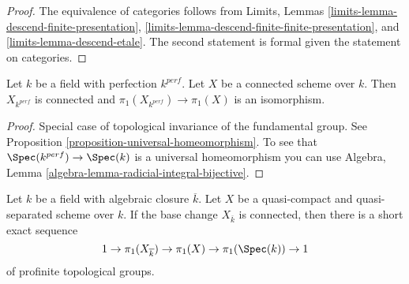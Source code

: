 \begin{proof}
The equivalence of categories follows from Limits, Lemmas
\ref{limits-lemma-descend-finite-presentation},
\ref{limits-lemma-descend-finite-finite-presentation}, and
\ref{limits-lemma-descend-etale}.
The second statement is formal given the statement on
categories.
\end{proof}

\begin{lemma}
\label{lemma-perfection}
Let $k$ be a field with perfection $k^{perf}$. Let $X$ be a connected scheme
over $k$. Then $X_{k^{perf}}$ is connected and
$\pi_1(X_{k^{perf}}) \to \pi_1(X)$ is an isomorphism.
\end{lemma}

\begin{proof}
Special case of topological invariance of the fundamental group.
See Proposition \ref{proposition-universal-homeomorphism}.
To see that $\Spec(k^{perf}) \to \Spec(k)$ is a universal
homeomorphism you can use
Algebra, Lemma \ref{algebra-lemma-radicial-integral-bijective}.
\end{proof}

\begin{lemma}
\label{lemma-ses-field}
Let $k$ be a field with algebraic closure $\overline{k}$.
Let $X$ be a quasi-compact and quasi-separated scheme over $k$.
If the base change $X_{\overline{k}}$ is connected, then
there is a short exact sequence
$$
1 \to \pi_1(X_{\overline{k}}) \to \pi_1(X) \to \pi_1(\Spec(k)) \to 1
$$
of profinite topological groups.
\end{lemma}

